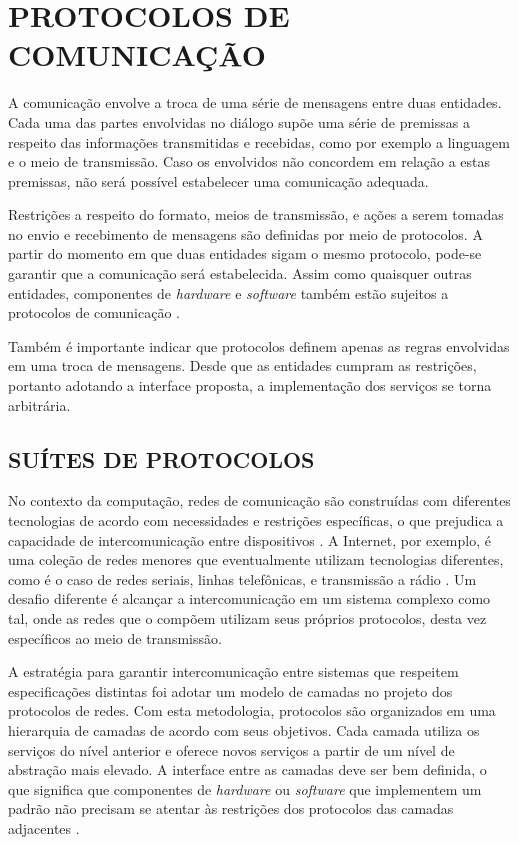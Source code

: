 \chapter{PROTOCOLOS DE COMUNICAÇÃO}

A comunicação envolve a troca de uma série de mensagens entre duas entidades. Cada
uma das partes envolvidas no diálogo supõe uma série de premissas a respeito das
informações transmitidas e recebidas, como por exemplo a linguagem e o meio de
transmissão. Caso os envolvidos não concordem em relação a estas premissas, não
será possível estabelecer uma comunicação adequada.

Restrições a respeito do formato, meios de transmissão, e ações a serem tomadas no
envio e recebimento de mensagens são definidas por meio de protocolos. A partir do
momento em que duas entidades sigam o mesmo protocolo, pode-se garantir que a
comunicação será estabelecida. Assim como quaisquer outras entidades, componentes de
\textit{hardware} e \textit{software} também estão sujeitos a protocolos de
comunicação \cite{kurose2012}.

Também é importante indicar que protocolos definem apenas as regras envolvidas em
uma troca de mensagens. Desde que as entidades cumpram as restrições, portanto
adotando a interface proposta, a implementação dos serviços se torna arbitrária.

\section{SUÍTES DE PROTOCOLOS}

No contexto da computação, redes de comunicação são construídas com diferentes
tecnologias de acordo com necessidades e restrições específicas, o que prejudica a
capacidade de intercomunicação entre dispositivos \cite{comer2000}. A Internet, por
exemplo, é uma coleção de redes menores que eventualmente utilizam tecnologias
diferentes, como é o caso de redes seriais, linhas telefônicas, e transmissão a
rádio \cite{tanenbaum2010}. Um desafio diferente é alcançar a intercomunicação em
um sistema complexo como tal, onde as redes que o compõem utilizam seus próprios
protocolos, desta vez específicos ao meio de transmissão.


A estratégia para garantir intercomunicação entre sistemas que respeitem
especificações distintas foi adotar um modelo de camadas no projeto dos protocolos
de redes. Com esta metodologia, protocolos são organizados em uma hierarquia de
camadas de acordo com seus objetivos. Cada camada utiliza os serviços do nível
anterior e oferece novos serviços a partir de um nível de abstração mais elevado. A
interface entre as camadas deve ser bem definida, o que significa que componentes de
\textit{hardware} ou \textit{software} que implementem um padrão não precisam se
atentar às restrições dos protocolos das camadas adjacentes \cite{kurose2012}.

